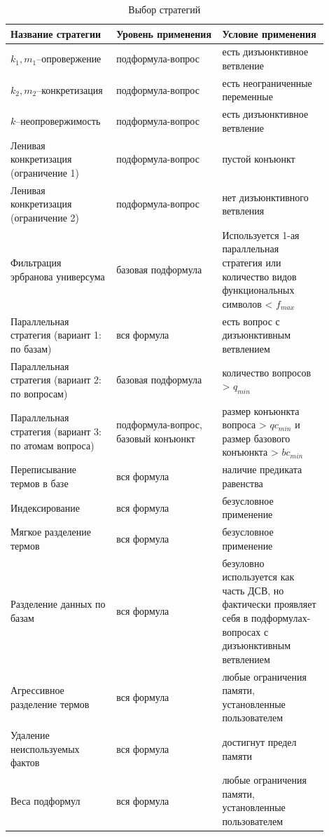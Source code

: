 \begin{longtable}[H]{|p{0.3\linewidth}|p{0.3\linewidth}|p{0.3\linewidth}|}
\caption{Выбор стратегий}\\
\hline
\textbf{Название стратегии} & \textbf{Уровень применения} & \textbf{Условие применения}\\
\hline
$k_1,m_1$--опровержение & подформула-вопрос & есть дизъюнктивное ветвление \\
\hline
$k_2,m_2$--конкретизация & подформула-вопрос & есть неограниченные переменные \\
\hline
$k$--неопровержимость & подформула-вопрос & есть дизъюнктивное ветвление \\
\hline
Ленивая конкретизация (ограничение 1) & подформула-вопрос & пустой конъюнкт \\
\hline
Ленивая конкретизация (ограничение 2) & подформула-вопрос & нет дизъюнктивного ветвления \\
\hline
Фильтрация эрбранова универсума & базовая подформула & Используется 1-ая параллельная стратегия или количество видов функциональных символов < $f_{max}$ \\
\hline
Параллельная стратегия (вариант 1: по базам) & вся формула & есть вопрос с дизъюнктивным ветвлением \\
\hline
Параллельная стратегия (вариант 2: по вопросам) & базовая подформула & количество вопросов > $q_{min}$ \\
\hline
Параллельная стратегия (вариант 3: по атомам вопроса) & подформула-вопрос, базовый конъюнкт & размер конъюнкта вопроса > $qc_{min}$ и размер базового конъюнкта > $bc_{min}$  \\
\hline
Переписывание термов в базе & вся формула & наличие предиката равенства \\
\hline
Индексирование & вся формула & безусловное применение \\
\hline
Мягкое разделение термов & вся формула & безусловное применение \\
\hline
Разделение данных по базам & вся формула & безуловно используется как часть ДСВ, но фактически проявляет себя в подформулах-вопросах с дизъюнктивным ветвлением \\
\hline
Агрессивное разделение термов & вся формула & любые ограничения памяти, установленные пользователем \\
\hline
Удаление неиспользуемых фактов & вся формула & достигнут предел памяти \\
\hline
Веса подформул & вся формула & любые ограничения памяти, установленные пользователем \\
\hline
\end{longtable}


